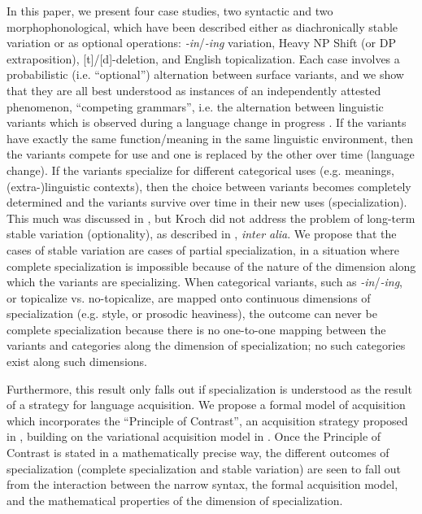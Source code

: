 \documentclass[a4paper,aps,prl,12pt,tightenlines,superscriptaddress]{revtex4}
\begin{document}
In this paper, we present four case studies, two syntactic and two morphophonological, which have been described either as diachronically stable variation or as optional operations: \textsl{-in}/\textsl{-ing} variation, Heavy NP Shift (or DP extraposition), [t]/[d]-deletion, and English topicalization.
Each case involves a probabilistic (i.e. ``optional'') alternation between surface variants, and we show that they are all best understood as instances of an independently attested phenomenon, ``competing grammars'', i.e. the alternation between linguistic variants which is observed during a language change in progress \citep[][]{kroch1989}.
If the variants have exactly the same function/meaning in the same linguistic environment, then the variants compete for use and one is replaced by the other over time (language change). 
If the variants specialize for different categorical uses (e.g. meanings, (extra-)linguistic  contexts), then the choice between variants becomes completely determined and the variants survive over time in their new uses (specialization). 
This much was discussed in \citep{kroch1994}, but Kroch did not address the problem of long-term stable variation (optionality), as described in \citet{labov1989}, \textsl{inter alia}. 
We propose that the cases of stable variation are cases of partial specialization, in a situation where complete specialization is impossible because of the nature of the dimension along which the variants are specializing.
When categorical variants, such as \textsl{-in}/\textsl{-ing}, or topicalize vs. no-topicalize, are mapped onto continuous dimensions of specialization (e.g. style, or prosodic heaviness), the outcome can never be complete specialization because there is no one-to-one mapping between the variants and categories along the dimension of specialization; no such categories exist along such dimensions.
 
Furthermore, this result only falls out if specialization is understood as the result of a strategy for language acquisition. 
We propose a formal model of acquisition which incorporates the ``Principle of Contrast'', an acquisition strategy proposed in \citet{clark1987, clark1990}, building on the variational acquisition model in \citet{yang2000}.
Once the Principle of Contrast is stated in a mathematically precise way, the different outcomes of specialization (complete specialization and stable variation) are seen to fall out from the interaction between the narrow syntax, the formal acquisition model, and the mathematical properties of the dimension of specialization.



\end{document}
